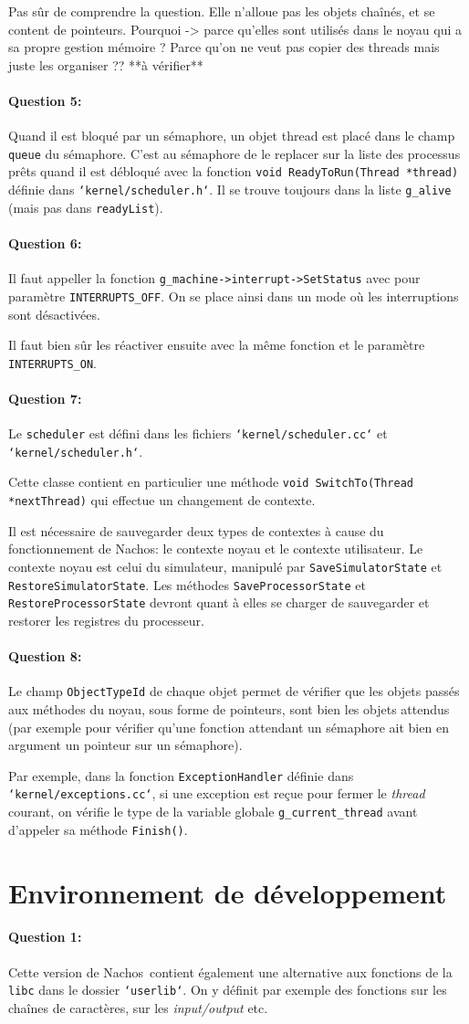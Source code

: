 \documentclass[11pt]{article}
\def\question#1{\paragraph{Question #1:}}
\def\pathfile#1{\texttt{`#1`}}
\def\var#1{\texttt{#1}}
\def\func#1{\texttt{#1}}
\def\obj#1{\texttt{#1}}
\def\comment#1{\color{red}#1\color{black}}
\def\nachos{Nachos}
\begin{document}
\comment{Pas sûr de comprendre la question. Elle n'alloue pas les objets chaînés, et se content de pointeurs. Pourquoi -> parce qu'elles sont utilisés dans le noyau qui a sa propre gestion mémoire ? Parce qu'on ne veut pas copier des threads mais juste les organiser ?? **à vérifier**  }

\question{5} Quand il est bloqué par un sémaphore, un objet thread est placé dans le champ \var{queue} du sémaphore. C'est au sémaphore de le replacer sur la liste des processus prêts quand il est débloqué avec la fonction \func{void ReadyToRun(Thread *thread)} définie dans \pathfile{kernel/scheduler.h}. Il se trouve toujours dans la liste \var{g\_alive} (mais pas dans \var{readyList}).

\question{6} Il faut appeller la fonction \func{g\_machine->interrupt->SetStatus} avec pour paramètre \var{INTERRUPTS\_OFF}. On se place ainsi dans un mode où les interruptions sont désactivées.  

Il faut bien sûr les réactiver ensuite avec la même fonction et le paramètre \var{INTERRUPTS\_ON}.

\question{7}  Le \obj{scheduler} est défini dans les fichiers \pathfile{kernel/scheduler.cc} et \pathfile{kernel/scheduler.h}.

Cette classe contient en particulier une méthode \func{void SwitchTo(Thread *nextThread)} qui effectue un changement de contexte.  

Il est nécessaire de sauvegarder deux types de contextes à cause du fonctionnement de \nachos: le contexte noyau et le contexte utilisateur.  
Le contexte noyau est celui du simulateur, manipulé par \func{SaveSimulatorState} et \func{RestoreSimulatorState}.  
Les méthodes \func{SaveProcessorState} et \func{RestoreProcessorState} devront quant à elles se charger de sauvegarder et restorer les registres du processeur.

\question{8}  Le champ \var{ObjectTypeId} de chaque objet permet de vérifier que les objets passés aux méthodes du noyau, sous forme de pointeurs, sont bien les objets attendus (par exemple pour vérifier qu'une fonction attendant un sémaphore ait bien en argument un pointeur sur un sémaphore).

Par exemple, dans la fonction \func{ExceptionHandler} définie dans \pathfile{kernel/exceptions.cc}, si une exception est reçue pour fermer le \textit{thread} courant, on vérifie le type de la variable globale \var{g\_current\_thread} avant d'appeler sa méthode \func{Finish()}.

\section*{Environnement de développement}
\question{1} 
Cette version de \nachos\ contient également une alternative aux fonctions de la \texttt{libc} dans le dossier \pathfile{userlib}. On y définit par exemple des fonctions sur les chaînes de caractères, sur les \textit{input/output} etc.
\end{document}
